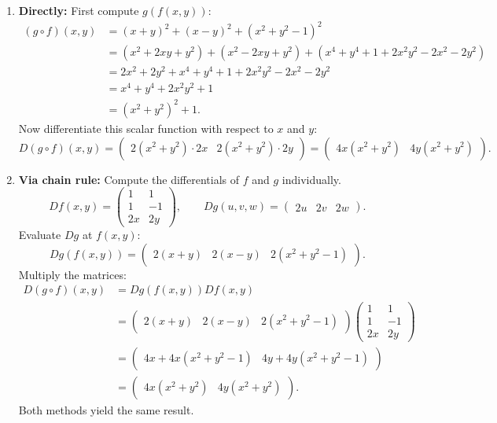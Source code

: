 \begin{exercisesolution}
\begin{enumerate}[label=\textbf{(\alph*)}]
  \item \textbf{Directly:} First compute $g(f(x,y))$:
    \begin{align*}
    (g \circ f)(x,y) &= (x+y)^2 + (x-y)^2 + (x^2+y^2-1)^2 \\
    &= (x^2+2xy+y^2) + (x^2-2xy+y^2) + (x^4+y^4+1+2x^2y^2-2x^2-2y^2) \\
    &= 2x^2 + 2y^2 + x^4 + y^4 + 1 + 2x^2y^2 - 2x^2 - 2y^2 \\
    &= x^4 + y^4 + 2x^2y^2 + 1 \\
    &= (x^2+y^2)^2 + 1.
    \end{align*}
    Now differentiate this scalar function with respect to $x$ and $y$:
    \[D(g \circ f)(x,y) = \begin{pmatrix} 2(x^2+y^2)\cdot 2x & 2(x^2+y^2)\cdot 2y \end{pmatrix} = \begin{pmatrix} 4x(x^2+y^2) & 4y(x^2+y^2) \end{pmatrix}.\]

  \item \textbf{Via chain rule:} Compute the differentials of $f$ and $g$ individually.
    \[Df(x,y) = \begin{pmatrix} 1 & 1 \\ 1 & -1 \\ 2x & 2y \end{pmatrix}, \qquad Dg(u,v,w) = \begin{pmatrix} 2u & 2v & 2w \end{pmatrix}.\]
    Evaluate $Dg$ at $f(x,y)$:
    \[Dg(f(x,y)) = \begin{pmatrix} 2(x+y) & 2(x-y) & 2(x^2+y^2-1) \end{pmatrix}.\]
    Multiply the matrices:
    \begin{align*}
    D(g \circ f)(x,y) &= Dg(f(x,y)) Df(x,y) \\
    &= \begin{pmatrix} 2(x+y) & 2(x-y) & 2(x^2+y^2-1) \end{pmatrix} \begin{pmatrix} 1 & 1 \\ 1 & -1 \\ 2x & 2y \end{pmatrix} \\
    &= \begin{pmatrix} 4x + 4x(x^2+y^2-1) & 4y + 4y(x^2+y^2-1) \end{pmatrix} \\
    &= \begin{pmatrix} 4x(x^2+y^2) & 4y(x^2+y^2) \end{pmatrix}.
    \end{align*}
    Both methods yield the same result.
\end{enumerate}
\end{exercisesolution}

